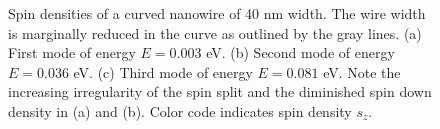 \begin{figure}[h!]
\caption{Spin densities of a curved nanowire of 40 nm width. The wire width is marginally reduced in the curve as outlined by the gray lines. (a) First mode of energy $E=0.003$ eV. (b) Second mode of energy $E=0.036$ eV. (c) Third mode of energy $E=0.081$ eV. Note the increasing irregularity of the spin split and the diminished spin down density in (a) and (b). Color code indicates spin density $s_z$.}
\end{figure}
